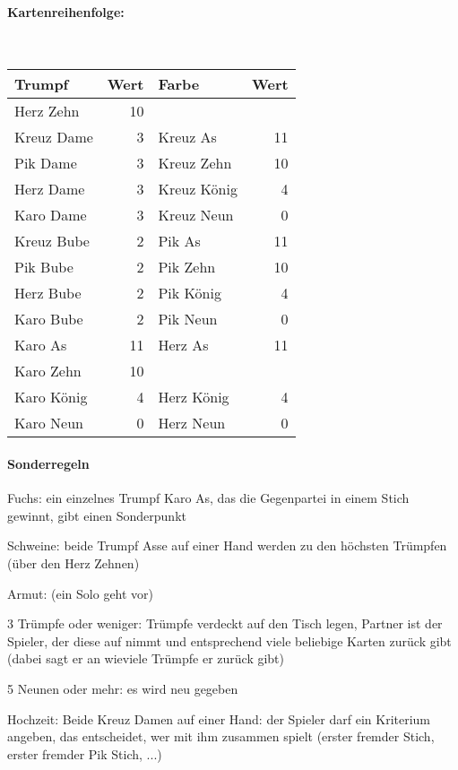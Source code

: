 \documentclass[11pt,twocolumn,landscape]{scrartcl}
\begin{document}
\thispagestyle{empty}
\paragraph{Kartenreihenfolge:}~

\begin{tabular}{lr|lr}
Trumpf & Wert & Farbe & Wert\\
\hline
Herz Zehn & 10 &  &      \\
Kreuz Dame & 3 &  Kreuz As & 11\\
Pik Dame & 3   &  Kreuz Zehn & 10\\
Herz Dame & 3  &  Kreuz König & 4\\
Karo Dame & 3  &Kreuz Neun  & 0\\
Kreuz Bube& 2  &   Pik As & 11\\
Pik Bube  & 2  &  Pik Zehn & 10\\
Herz Bube & 2  &  Pik König & 4\\
Karo Bube & 2  &  Pik Neun   & 0\\
Karo As   & 11 & Herz As    & 11\\
Karo Zehn & 10 &            & \\
Karo König & 4 & Herz König& 4\\
Karo Neun   & 0 & Herz Neun  &0\\
\end{tabular}

\paragraph{Sonderregeln}
\begin{compactdesc}
\item[Fuchs:] ein einzelnes Trumpf Karo As, das die Gegenpartei in einem Stich gewinnt, gibt einen Sonderpunkt
\item[Schweine:] beide Trumpf Asse auf einer Hand werden zu den höchsten Trümpfen (über den Herz Zehnen)
\item[Armut:] (ein Solo geht vor)
\begin{compactitem}
\item 3 Trümpfe oder weniger: Trümpfe verdeckt auf den Tisch legen, Partner ist der Spieler, der diese auf nimmt und entsprechend viele
beliebige Karten zurück gibt (dabei sagt er an wieviele Trümpfe er zurück gibt)
\item 5 Neunen oder mehr: es wird neu gegeben
\end{compactitem}
\item[Hochzeit:] Beide Kreuz Damen auf einer Hand: der Spieler darf ein Kriterium angeben, das entscheidet, wer mit ihm zusammen spielt
(erster fremder Stich, erster fremder Pik Stich, ...)
\end{compactdesc}
\end{document}

